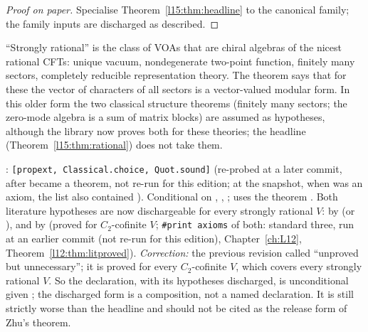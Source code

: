 \begin{proof}[Proof on paper]
Specialise Theorem~\ref{l15:thm:headline} to the canonical family; the family inputs are discharged as described.
\end{proof}

\begin{physics}
``Strongly rational'' is the class of VOAs that are chiral algebras of the nicest rational CFTs: unique vacuum, nondegenerate
two-point function, finitely many sectors, completely reducible representation theory. The theorem says that for these
the vector of characters of all sectors is a vector-valued modular form. In this older form the two classical structure
theorems (finitely many sectors; the zero-mode algebra is a sum of matrix blocks) are assumed as hypotheses, although the
library now proves both for these theories; the headline (Theorem~\ref{l15:thm:rational}) does not take them.
\end{physics}

\begin{status}
\allowbreak{}: \texttt{[propext, Classical.choice, Quot.sound]} (re-probed
at a later commit, after  became a theorem, not re-run for this edition; at the snapshot, when  was an axiom, the list also contained ). Conditional on
, , ; uses the theorem
. Both literature hypotheses are now dischargeable for every strongly rational $V$:
 by  (or ), and
 by  (proved for $C_2$-cofinite $V$;
\texttt{\#print axioms} of both: standard three, run at an earlier commit (not re-run for this edition), Chapter~\ref{ch:L12}, Theorem~\ref{l12:thm:litproved}).
\emph{Correction:} the previous revision called  ``unproved but unnecessary''; it is
proved for every $C_2$-cofinite $V$, which covers every strongly rational $V$. So the declaration, with its hypotheses
discharged, is unconditional given ; the discharged form is a composition, not a named declaration.
It is still strictly worse than the headline \allowbreak{}\allowbreak{} and should not be
cited as the release form of Zhu's theorem.
\end{status}

